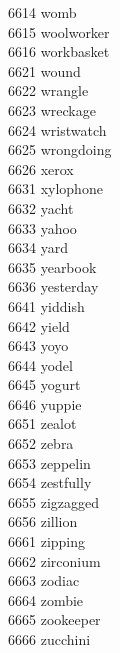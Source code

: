6614 womb \\
6615 woolworker \\
6616 workbasket \\
6621 wound \\
6622 wrangle \\
6623 wreckage \\
6624 wristwatch \\
6625 wrongdoing \\
6626 xerox \\
6631 xylophone \\
6632 yacht \\
6633 yahoo \\
6634 yard \\
6635 yearbook \\
6636 yesterday \\
6641 yiddish \\
6642 yield \\
6643 yoyo \\
6644 yodel \\
6645 yogurt \\
6646 yuppie \\
6651 zealot \\
6652 zebra \\
6653 zeppelin \\
6654 zestfully \\
6655 zigzagged \\
6656 zillion \\
6661 zipping \\
6662 zirconium \\
6663 zodiac \\
6664 zombie \\
6665 zookeeper \\
6666 zucchini \\
